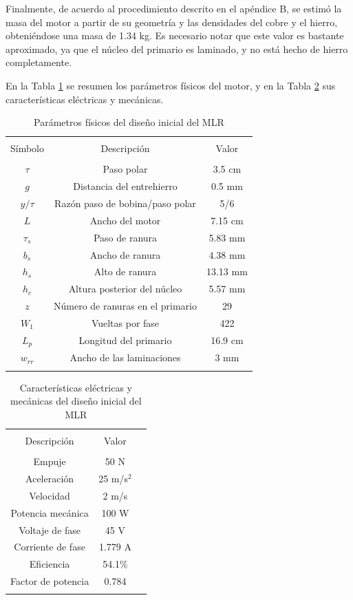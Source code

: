 Finalmente, de acuerdo al procedimiento descrito en el apéndice B, se estimó la masa del motor a partir de su geometría y las densidades del cobre y el hierro, obteniéndose una masa de 1.34 kg. Es necesario notar que este valor es bastante aproximado, ya que el núcleo del primario es laminado, y no está hecho de hierro completamente.

En la Tabla \ref{table:physicalparams} se resumen los parámetros físicos del motor, y en la Tabla \ref{table:electmechparams} sus características eléctricas y mecánicas.

\begin{table}[btp]
\centering
\caption{Parámetros físicos del diseño inicial del MLR}
\label{table:physicalparams}
\begin{tabular}{c c c}
\hline\hline\\
Símbolo & Descripción & Valor \\
\hline\\
$\tau$ & Paso polar & 3.5 cm\\
$g$ & Distancia del entrehierro & 0.5 mm\\
$y/\tau$ & Razón paso de bobina/paso polar & 5/6\\
$L$ & Ancho del motor & 7.15 cm\\
$\tau_s$ & Paso de ranura & 5.83 mm\\
$b_s$ & Ancho de ranura & 4.38 mm\\
$h_s$ & Alto de ranura & 13.13 mm\\
$h_c$ & Altura posterior del núcleo & 5.57 mm\\
$z$ & Número de ranuras en el primario & 29\\
$W_1$ & Vueltas por fase & 422\\
$L_p$ & Longitud del primario & 16.9 cm\\
$w_{rr}$ & Ancho de las laminaciones & 3 mm\\
\hline\hline\\
\end{tabular}
\end{table}

\begin{table}[btp]
\centering
\caption{Características eléctricas y mecánicas del diseño inicial del MLR}
\label{table:electmechparams}
\begin{tabular}{c c c}
\hline\hline\\
Descripción & Valor \\
\hline\\
Empuje & 50 N\\
Aceleración & 25 m/s$^2$\\
Velocidad & 2 m/s\\
Potencia mecánica & 100 W\\
Voltaje de fase & 45 V\\
Corriente de fase & 1.779 A\\
Eficiencia & 54.1\%\\
Factor de potencia & 0.784\\
\hline\hline\\
\end{tabular}
\end{table}

